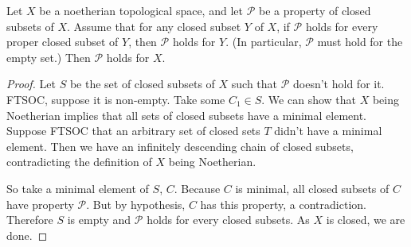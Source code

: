 \begin{exercise}
	Let $X$ be a noetherian topological space, and let $\mathscr{P}$ be a property of closed subsets of $X$. Assume that for any closed subset $Y$ of $X$, if $\mathscr{P} $ holds for every proper closed subset of $Y$, then $\mathscr{P} $ holds for $Y$. (In particular, $\mathscr{P}$ must hold for the empty set.) Then $\mathscr{P} $ holds for $X$.
\end{exercise}
\begin{proof}
	Let $S $ be the set of closed subsets of $X $ such that $\mathscr{P} $ doesn't hold for it.
	FTSOC, suppose it is non-empty.
	Take some $C_{1} \in S $.
	We can show that $X $ being Noetherian implies that all sets of closed subsets have a minimal element.
	Suppose FTSOC that an arbitrary set of closed sets $T $ didn't have a minimal element.
	Then we have an infinitely descending chain of closed subsets, contradicting the definition of $X $ being Noetherian.

	So take a minimal element of $S $, $C $.
	Because $C $ is minimal, all closed subsets of $C $ have property $\mathscr{P} $.
	But by hypothesis, $C $ has this property, a contradiction.
	Therefore $S $ is empty and $\mathscr{P} $ holds for every closed subsets.
	As $X $ is closed, we are done.
\end{proof}

